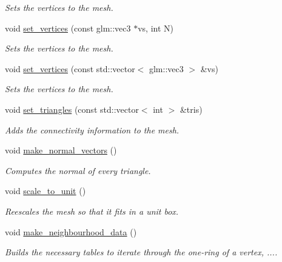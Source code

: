\begin{DoxyCompactItemize}
\begin{DoxyCompactList}\small\item\em Sets the vertices to the mesh. \end{DoxyCompactList}\item 
void \hyperlink{classgeoproc_1_1TriangleMesh_a09b76789e908062501de253d360e0236}{set\+\_\+vertices} (const glm\+::vec3 $\ast$vs, int N)
\begin{DoxyCompactList}\small\item\em Sets the vertices to the mesh. \end{DoxyCompactList}\item 
void \hyperlink{classgeoproc_1_1TriangleMesh_a2bd9a343db1642d11b39b6fab5710d3a}{set\+\_\+vertices} (const std\+::vector$<$ glm\+::vec3 $>$ \&vs)
\begin{DoxyCompactList}\small\item\em Sets the vertices to the mesh. \end{DoxyCompactList}\item 
void \hyperlink{classgeoproc_1_1TriangleMesh_a5e35cad5c18195e6397f22bc951161f1}{set\+\_\+triangles} (const std\+::vector$<$ int $>$ \&tris)
\begin{DoxyCompactList}\small\item\em Adds the connectivity information to the mesh. \end{DoxyCompactList}\item 
void \hyperlink{classgeoproc_1_1TriangleMesh_a638f0267d7d8e51498330e414fa25bfe}{make\+\_\+normal\+\_\+vectors} ()
\begin{DoxyCompactList}\small\item\em Computes the normal of every triangle. \end{DoxyCompactList}\item 
void \hyperlink{classgeoproc_1_1TriangleMesh_a2b34ddfa21f906805451e6dbbb4ce064}{scale\+\_\+to\+\_\+unit} ()
\begin{DoxyCompactList}\small\item\em Reescales the mesh so that it fits in a unit box. \end{DoxyCompactList}\item 
void \hyperlink{classgeoproc_1_1TriangleMesh_a84003dfdfd5e591c00f01a797578ff1f}{make\+\_\+neighbourhood\+\_\+data} ()
\begin{DoxyCompactList}\small\item\em Builds the necessary tables to iterate through the one-\/ring of a vertex, .... \end{DoxyCompactList}\item 

\end{DoxyCompactItemize}

